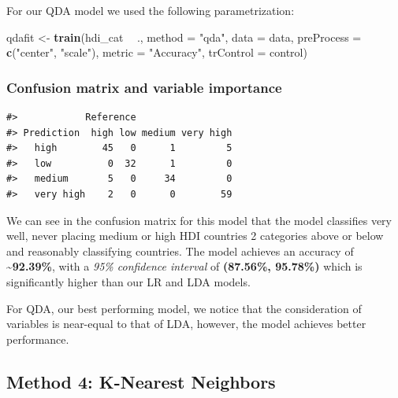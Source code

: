 \documentclass[]{article}
\newenvironment{Shaded}{\begin{snugshade}}{\end{snugshade}}
\newcommand{\DataTypeTok}[1]{\textcolor[rgb]{0.13,0.29,0.53}{#1}}
\newcommand{\KeywordTok}[1]{\textcolor[rgb]{0.13,0.29,0.53}{\textbf{#1}}}
\newcommand{\NormalTok}[1]{#1}
\newcommand{\OperatorTok}[1]{\textcolor[rgb]{0.81,0.36,0.00}{\textbf{#1}}}
\newcommand{\StringTok}[1]{\textcolor[rgb]{0.31,0.60,0.02}{#1}}
\begin{document}
For our QDA model we used the following parametrization:

\footnotesize

\begin{Shaded}
\begin{Highlighting}[]
\NormalTok{qdafit <-}\StringTok{ }\KeywordTok{train}\NormalTok{(hdi_cat }\OperatorTok{~}\StringTok{ }\NormalTok{., }\DataTypeTok{method =} \StringTok{"qda"}\NormalTok{, }\DataTypeTok{data =}\NormalTok{ data, }\DataTypeTok{preProcess =} \KeywordTok{c}\NormalTok{(}\StringTok{"center"}\NormalTok{, }\StringTok{"scale"}\NormalTok{),}
                \DataTypeTok{metric =} \StringTok{"Accuracy"}\NormalTok{, }\DataTypeTok{trControl =}\NormalTok{ control)}
\end{Highlighting}
\end{Shaded}

\normalsize

\hypertarget{confusion-matrix-and-variable-importance-2}{%
\subsubsection{Confusion matrix and variable
importance}\label{confusion-matrix-and-variable-importance-2}}

\footnotesize

\begin{verbatim}
#>            Reference
#> Prediction  high low medium very high
#>   high        45   0      1         5
#>   low          0  32      1         0
#>   medium       5   0     34         0
#>   very high    2   0      0        59
\end{verbatim}

\normalsize

We can see in the confusion matrix for this model that the model
classifies very well, never placing medium or high HDI countries 2
categories above or below and reasonably classifying countries. The
model achieves an accuracy of \textbf{\textasciitilde{}92.39\%}, with a
\emph{95\% confidence interval} of \textbf{(87.56\%, 95.78\%)} which is
significantly higher than our LR and LDA models.

For QDA, our best performing model, we notice that the consideration of
variables is near-equal to that of LDA, however, the model achieves
better performance.

\hypertarget{method-4-k-nearest-neighbors}{%
\subsection{Method 4: K-Nearest
Neighbors}\label{method-4-k-nearest-neighbors}}
\end{document}

